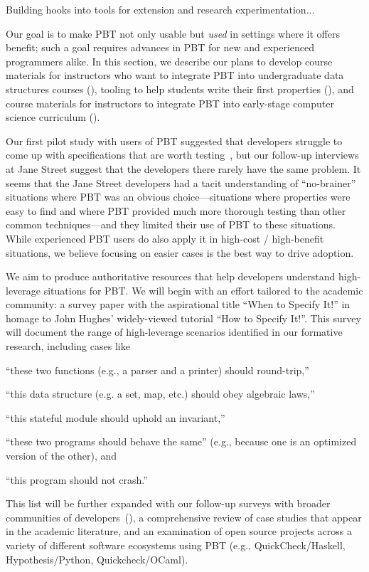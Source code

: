 Building hooks into tools for extension and research experimentation...

%
Our goal is to make PBT not only usable but {\em
used} in settings where it offers benefit; such a goal requires advances in PBT
 for
new and experienced programmers alike. In this section, we describe
our plans to develop
course materials for instructors who want to integrate PBT into
undergraduate data structures courses (),
%
tooling to help students write their first properties
(),
%
and course materials for instructors to integrate PBT into
early-stage computer science curriculum ().


%
Our first pilot study with users of PBT suggested that developers struggle to
come up with specifications that are worth
testing~\cite{goldstein_problems_2022},
but
our follow-up interviews at Jane Street suggest that the developers there
rarely have the same problem. It seems that the Jane Street developers had
a tacit
understanding of ``no-brainer'' situations where PBT was an obvious
choice---situations where properties were easy to find and where PBT provided
much more thorough testing than other common techniques---and they limited their
use of PBT to these situations.
While experienced PBT users do also apply it in
high-cost / high-benefit situations, we believe
focusing on easier cases is the best way to drive adoption.

We aim to produce authoritative resources that help developers understand
high-leverage situations for PBT. We will begin with an effort
tailored to the academic community: a survey paper with the
aspirational title ``When to Specify It!'' in homage to John Hughes'
widely-viewed tutorial ``How to Specify It!''. This survey will
document the range of high-leverage scenarios identified in our formative
research, including cases like
\begin{enumerate*}[label=(\arabic{enumi})]
\item ``these two functions (e.g., a parser and a printer) should round-trip,''
\item ``this data structure (e.g. a set, map, etc.) should obey algebraic laws,''
\item ``this stateful module should uphold an invariant,''
\item ``these two programs should behave the same'' (e.g., because one
is an optimized version of the other),
and
\item ``this program should not crash.''
\end{enumerate*}
This list will be further expanded with our follow-up surveys with broader
communities of developers~(), a comprehensive
review of case studies that appear in
the academic literature, and an examination of open source projects across a
variety of different software ecosystems using PBT (e.g.,
QuickCheck/Haskell, Hypothesis/Python, Quickcheck/OCaml).

